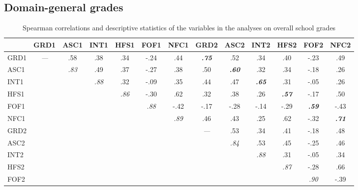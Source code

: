 \documentclass[
  man]{apa6}
\begin{document}
\hypertarget{domain-general-grades}{%
\subsection{Domain-general grades}\label{domain-general-grades}}

\begin{table}[tbp]

\begin{center}
\begin{threeparttable}

\caption{\label{tab:corr}Spearman correlations and descriptive statistics of the variables in the analyses on overall school grades}

\footnotesize{

\begin{tabular}{lcccccccccccc}
\toprule
 & \multicolumn{1}{c}{GRD1} & \multicolumn{1}{c}{ASC1} & \multicolumn{1}{c}{INT1} & \multicolumn{1}{c}{HFS1} & \multicolumn{1}{c}{FOF1} & \multicolumn{1}{c}{NFC1} & \multicolumn{1}{c}{GRD2} & \multicolumn{1}{c}{ASC2} & \multicolumn{1}{c}{INT2} & \multicolumn{1}{c}{HFS2} & \multicolumn{1}{c}{FOF2} & \multicolumn{1}{c}{NFC2}\\
\midrule
GRD1 & \textit{—} & .58 & .38 & .34 & -.24 & .44 & \textbf{\textit{.75}} & .52 & .34 & .40 & -.23 & .49\\
ASC1 &  & \textit{.83} & .49 & .37 & -.27 & .38 & .50 & \textbf{\textit{.60}} & .32 & .34 & -.18 & .26\\
INT1 &  &  & \textit{.88} & .32 & -.09 & .35 & .44 & .47 & \textbf{\textit{.65}} & .31 & -.05 & .26\\
HFS1 &  &  &  & \textit{.86} & -.30 & .62 & .32 & .38 & .26 & \textbf{\textit{.57}} & -.17 & .50\\
FOF1 &  &  &  &  & \textit{.88} & -.42 & -.17 & -.28 & -.14 & -.29 & \textbf{\textit{.59}} & -.43\\
NFC1 &  &  &  &  &  & \textit{.89} & .46 & .43 & .25 & .62 & -.32 & \textbf{\textit{.71}}\\
GRD2 &  &  &  &  &  &  & \textit{—} & .53 & .34 & .41 & -.18 & .48\\
ASC2 &  &  &  &  &  &  &  & \textit{.84} & .53 & .45 & -.25 & .46\\
INT2 &  &  &  &  &  &  &  &  & \textit{.88} & .31 & -.05 & .34\\
HFS2 &  &  &  &  &  &  &  &  &  & \textit{.87} & -.28 & .66\\
FOF2 &  &  &  &  &  &  &  &  &  &  & \textit{.90} & -.39\\

\end{tabular}}
\end{threeparttable}
\end{center}
\end{table}
\end{document}
